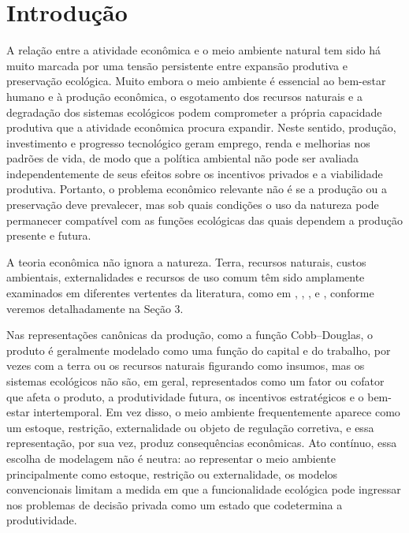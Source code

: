 \section{Introdução}


A relação entre a atividade econômica e o meio ambiente natural tem sido há muito marcada por uma tensão persistente entre expansão produtiva e preservação ecológica. Muito embora o meio ambiente é essencial ao bem-estar humano e à produção econômica, o esgotamento dos recursos naturais e a degradação dos sistemas ecológicos podem comprometer a própria capacidade produtiva que a atividade econômica procura expandir. Neste sentido, produção, investimento e progresso tecnológico geram emprego, renda e melhorias nos padrões de vida, de modo que a política ambiental não pode ser avaliada independentemente de seus efeitos sobre os incentivos privados e a viabilidade produtiva. Portanto, o problema econômico relevante não é se a produção ou a preservação deve prevalecer, mas sob quais condições o uso da natureza pode permanecer compatível com as funções ecológicas das quais dependem a produção presente e futura.

A teoria econômica não ignora a natureza. Terra, recursos naturais, custos ambientais, externalidades e recursos de uso comum têm sido amplamente examinados em diferentes vertentes da literatura, como em , , ,  e , conforme veremos detalhadamente na Seção 3.

Nas representações canônicas da produção, como a função Cobb–Douglas, o produto é geralmente modelado como uma função do capital e do trabalho, por vezes com a terra ou os recursos naturais figurando como insumos, mas os sistemas ecológicos não são, em geral, representados como um fator ou cofator que afeta o produto, a produtividade futura, os incentivos estratégicos e o bem-estar intertemporal. Em vez disso, o meio ambiente frequentemente aparece como um estoque, restrição, externalidade ou objeto de regulação corretiva, e essa representação, por sua vez, produz consequências econômicas. Ato contínuo, essa escolha de modelagem não é neutra: ao representar o meio ambiente principalmente como estoque, restrição ou externalidade, os modelos convencionais limitam a medida em que a funcionalidade ecológica pode ingressar nos problemas de decisão privada como um estado que codetermina a produtividade.

